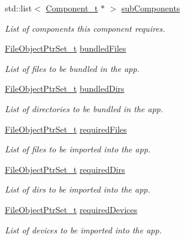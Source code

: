 \begin{DoxyCompactItemize}
std\+::list$<$ \hyperlink{struct_component__t}{Component\+\_\+t} $\ast$ $>$ \hyperlink{struct_component__t_a93b979c7bee7a4186d6fe5bca3238fe1}{sub\+Components}
\begin{DoxyCompactList}\small\item\em List of components this component requires. \end{DoxyCompactList}\item 
\hyperlink{file_system_object_8h_a47249ccd5f5ed84092b6523e81f5a398}{File\+Object\+Ptr\+Set\+\_\+t} \hyperlink{struct_component__t_ac580f312b35c51ca0025b38673b9839d}{bundled\+Files}
\begin{DoxyCompactList}\small\item\em List of files to be bundled in the app. \end{DoxyCompactList}\item 
\hyperlink{file_system_object_8h_a47249ccd5f5ed84092b6523e81f5a398}{File\+Object\+Ptr\+Set\+\_\+t} \hyperlink{struct_component__t_a96e93367726c5ca50b9a5dd700cedfaa}{bundled\+Dirs}
\begin{DoxyCompactList}\small\item\em List of directories to be bundled in the app. \end{DoxyCompactList}\item 
\hyperlink{file_system_object_8h_a47249ccd5f5ed84092b6523e81f5a398}{File\+Object\+Ptr\+Set\+\_\+t} \hyperlink{struct_component__t_a8aabc11a3a06b089a9a140cc0c7be020}{required\+Files}
\begin{DoxyCompactList}\small\item\em List of files to be imported into the app. \end{DoxyCompactList}\item 
\hyperlink{file_system_object_8h_a47249ccd5f5ed84092b6523e81f5a398}{File\+Object\+Ptr\+Set\+\_\+t} \hyperlink{struct_component__t_a3f50b7db2fb2b00793dbf02d45471972}{required\+Dirs}
\begin{DoxyCompactList}\small\item\em List of dirs to be imported into the app. \end{DoxyCompactList}\item 
\hyperlink{file_system_object_8h_a47249ccd5f5ed84092b6523e81f5a398}{File\+Object\+Ptr\+Set\+\_\+t} \hyperlink{struct_component__t_ad7349b66409d8767fc2ea653f87034cb}{required\+Devices}
\begin{DoxyCompactList}\small\item\em List of devices to be imported into the app. \end{DoxyCompactList}\item 

\end{DoxyCompactItemize}
